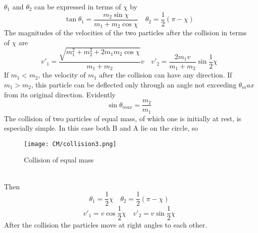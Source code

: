 \documentclass[cyan]{elegantnote}
\begin{document}
$\theta_1$ and $\theta_2$ can be expressed in terms of $\chi$ by
\[\tan\theta_1 = \frac{m_2\sin\chi}{m_1 + m_2 \cos\chi} \quad \theta_2 = \frac{1}{2}(\pi - \chi)\]
The magnitudes of the velocities of the two particles after the collision in terms of $\chi$ are
\[v'_1 = \frac{\sqrt{m_1^2 + m_2^2 + 2m_1m_2\cos\chi}}{m_1+m_2}v \quad v'_2 = \frac{2m_1v}{m_1+m_2}\sin\frac{1}{2}\chi\]
If $m_1 < m_2$, the velocity of $m_1$ after the collision can have any direction.
If $m_1 > m_2$, this particle can be deflected only through an angle not exceeding $\theta_max$ from its original direction. Evidently
\[\sin\theta_{max} = \frac{m_2}{m_1}\]
The collision of two particles of equal mass, of which one is initially at rest, is especially simple. In this case both B and A lie on the circle, so
\begin{figure}[!h]
	\centering
	\texttt{[image: CM/collision3.png]}
	\caption{Collision of equal mass}
\end{figure}\\
Then 
\[\theta_1 = \frac{1}{2}\chi \quad \theta_2 = \frac{1}{2}(\pi-\chi)\]
\[v'_1 = v\cos\frac{1}{2}\chi \quad v'_2 = v\sin\frac{1}{2}\chi\]
After the collision the particles move at right angles to each other.
\end{document}

